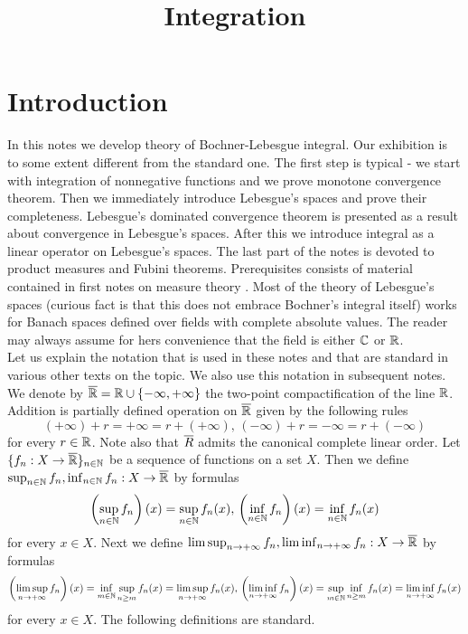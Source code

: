 



\title{Integration}
\date{}
\maketitle

\section{Introduction}
In this notes we develop theory of Bochner-Lebesgue integral. Our exhibition is to some extent different from the standard one. The first step is typical - we start with integration of nonnegative functions and we prove monotone convergence theorem. Then we immediately introduce Lebesgue's spaces and prove their completeness. Lebesgue's dominated convergence theorem is presented as a result about convergence in Lebesgue's spaces. After this we introduce integral as a linear operator on Lebesgue's spaces. The last part of the notes is devoted to product measures and Fubini theorems. Prerequisites consists of material contained in first notes on measure theory \cite{Introduction_to_measure_theory}. Most of the theory of Lebesgue's spaces (curious fact is that this does not embrace Bochner's integral itself) works for Banach spaces defined over fields with complete absolute values. The reader may always assume for hers convenience that the field is either ${\mathbb C}$ or ${\mathbb R}$.\\
Let us explain the notation that is used in these notes and that are standard in various other texts on the topic. We also use this notation in subsequent notes. We denote by $\overline{{\mathbb R}}={\mathbb R}\cup \{-\infty,+\infty\}$ the two-point compactification of the line ${\mathbb R}$. Addition is partially defined operation on $\overline{{\mathbb R}}$ given by the following rules
$$(+\infty)+r=+\infty=r+(+\infty),\,(-\infty)+r=-\infty=r+(-\infty)$$
for every $r\in {\mathbb R}$. Note also that $\overline{R}$ admits the canonical complete linear order. Let $\{f_n:X\rightarrow \overline{{\mathbb R}}\}_{n\in {\mathbb N}}$ be a sequence of functions on a set $X$. Then we define $\sup_{n\in {\mathbb N}}f_n,\inf_{n\in {\mathbb N}}f_n:X\rightarrow \overline{{\mathbb R}}$ by formulas
$$\left(\sup_{n\in {\mathbb N}}f_n\right)(x) = \sup_{n\in {\mathbb N}}f_n(x),\,\left(\inf_{n\in {\mathbb N}}f_n\right)(x) = \inf_{n\in {\mathbb N}}f_n(x)$$
for every $x\in X$. Next we define $\limsup_{n\rightarrow +\infty}f_n,\liminf_{n\rightarrow +\infty}f_n:X\rightarrow \overline{{\mathbb R}}$ by formulas
$$\left(\limsup_{n\rightarrow +\infty}f_n\right)(x) =\inf_{m\in {\mathbb N}}\sup_{n\geq m}f_n(x) = \limsup_{n\rightarrow +\infty}f_n(x),\,\left(\liminf_{n\rightarrow +\infty}f_n\right)(x) = \sup_{m\in {\mathbb N}}\inf_{n\geq m}f_n(x) = \liminf_{n\rightarrow +\infty}f_n(x)$$
for every $x\in X$. The following definitions are standard.

